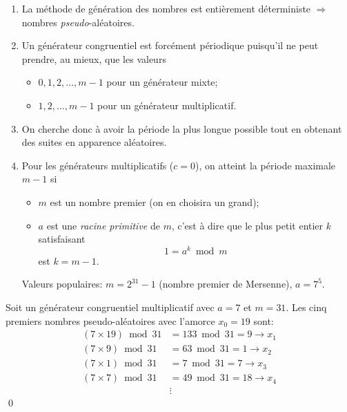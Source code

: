 \begin{rems}
  \begin{enumerate}
  \item La méthode de génération des nombres est entièrement
    déterministe $\Rightarrow$ nombres \emph{pseudo}-aléatoires.
  \item Un générateur congruentiel est forcément périodique puisqu'il
    ne peut prendre, au mieux, que les valeurs
    \begin{itemize}
    \item $0, 1, 2, \dots, m - 1$ pour un générateur mixte;
    \item $1, 2, \dots, m - 1$ pour un générateur multiplicatif.
    \end{itemize}
  \item On cherche donc à avoir la période la plus longue possible
    tout en obtenant des suites en apparence aléatoires.
  \item Pour les générateurs multiplicatifs ($c = 0$), on atteint la
    période maximale $m - 1$ si
    \begin{itemize}
    \item $m$ est un nombre premier (on en choisira un grand);
    \item $a$ est une \emph{racine primitive} de $m$, c'est à dire que
      le plus petit entier $k$ satisfaisant
      \begin{displaymath}
        1 = a^k \bmod m
      \end{displaymath}
      est $k = m - 1$.
    \end{itemize}
    Valeurs populaires: $m = 2^{31} - 1$ (nombre premier de Mersenne),
    $a = 7^5$.
  \end{enumerate}
\end{rems}

\begin{exemple}
  Soit un générateur congruentiel multiplicatif avec $a = 7$ et $m =
  31$. Les cinq premiers nombres pseudo-aléatoires avec l'amorce $x_0
  = 19$ sont:
  \begin{align*}
    (7 \times 19) \bmod 31 &= 133 \bmod 31 = 9 \rightarrow x_1 \\
    (7 \times 9) \bmod 31 &= 63 \bmod 31 = 1 \rightarrow x_2 \\
    (7 \times 1) \bmod 31 &= 7 \bmod 31 = 7 \rightarrow x_3 \\
    (7 \times 7) \bmod 31 &= 49 \bmod 31 = 18 \rightarrow x_4 \\
    &\vdots
  \end{align*}
  \qed
\end{exemple}

